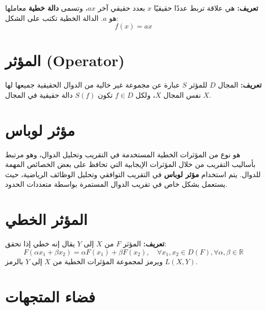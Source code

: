 	\textbf{تعريف:}  
	هي علاقة تربط عددًا حقيقيًا \( x \) بعدد حقيقي آخر \( ax \)، وتسمى \textbf{دالة خطية} معاملها هو \( a \). الدالة الخطية تكتب على الشكل:
	\[
	f(x) = ax
	\]
	
	\section{المؤثر (Operator)}
	
	\textbf{تعريف:}  
	المجال \( D \) للمؤثر \( S \) عبارة عن مجموعة غير خالية من الدوال الحقيقية جميعها لها نفس المجال \( X \)، ولكل \( f \in D \) تكون \( S(f) \) دالة حقيقية في المجال \( X \).
	
	\section{مؤثر لوباس }
	
	هو نوع من المؤثرات الخطية المستخدمة في التقريب وتحليل الدوال، وهو مرتبط بأساليب التقريب من خلال المؤثرات الإيجابية التي تحافظ على بعض الخصائص المهمة للدوال.  
	يتم استخدام \textbf{مؤثر لوباس} في التقريب التوافقي وتحليل الوظائف الرياضية، حيث يستعمل بشكل خاص في تقريب الدوال المستمرة بواسطة متعددات الحدود.
	
	\section{المؤثر الخطي }
	
	\textbf{تعريف:}  
	المؤثر \( F \) من \( X \) إلى \( Y \) يقال إنه خطي إذا تحقق:
	\[
	F(\alpha x_1 + \beta x_2) = \alpha F(x_1) + \beta F(x_2), \quad \forall x_1, x_2 \in D(F), \forall \alpha, \beta \in \mathbb{R}
	\]
	ويرمز لمجموعة المؤثرات الخطية من \( X \) إلى \( Y \) بالرمز \( L(X,Y) \).
	
	\section{فضاء المتجهات }
	
